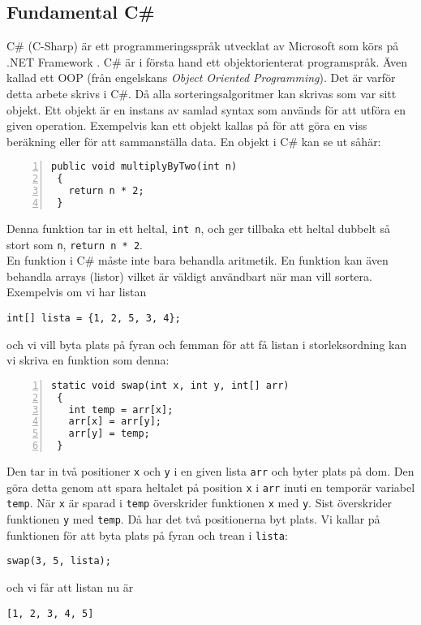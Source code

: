 \documentclass[a4, oneside]{report}
\begin{document}
\subsection{Fundamental C\#}
C\# (C-Sharp) är ett programmeringsspråk utvecklat av Microsoft som körs på .NET Framework \cite{7}. C\# är i första hand ett objektorienterat programspråk. Även kallad ett OOP (från engelskans \textit{Object Oriented Programming}). Det är varför detta arbete skrivs i C\#. Då alla sorteringsalgoritmer kan skrivas som var sitt objekt. Ett objekt är en instans av samlad syntax som används för att utföra en given operation. Exempelvis kan ett objekt kallas på för att göra en viss beräkning eller för att sammanställa data. En objekt i C\# kan se ut såhär:
\begin{lstlisting}[style=mystyle, numbers=left]
 public void multiplyByTwo(int n)
 {
   return n * 2;
 }
\end{lstlisting}
Denna funktion tar in ett heltal, \lstinline{int n}, och ger tillbaka ett heltal dubbelt så stort som \lstinline{n}, \lstinline{return n * 2}.\\
En funktion i C\# måste inte bara behandla aritmetik. En funktion kan även behandla arrays (listor) vilket är väldigt användbart när man vill sortera. Exempelvis om vi har listan
\begin{lstlisting}[style=mystyle, numbers=none]
 int[] lista = {1, 2, 5, 3, 4};
\end{lstlisting}
och vi vill byta plats på fyran och femman för att få listan i storleksordning kan vi skriva en funktion som denna:
\begin{lstlisting}[style=mystyle, numbers=left]
 static void swap(int x, int y, int[] arr)
 {
   int temp = arr[x];
   arr[x] = arr[y];
   arr[y] = temp;
 }
\end{lstlisting}
Den tar in två positioner \lstinline{x} och \lstinline{y} i en given lista \lstinline{arr} och byter plats på dom. Den göra detta genom att spara heltalet på position \lstinline{x} i \lstinline{arr} inuti en temporär variabel \lstinline{temp}. När \lstinline{x} är sparad i \lstinline{temp} överskrider funktionen \lstinline{x} med \lstinline{y}. Sist överskrider funktionen \lstinline{y} med \lstinline{temp}. Då har det två positionerna byt plats. Vi kallar på funktionen för att byta plats på fyran och trean i \lstinline{lista}:
\begin{lstlisting}[style=mystyle, numbers=none]
 swap(3, 5, lista);
\end{lstlisting}
och vi får att listan nu är 
\begin{lstlisting}[style=mystyle, numbers=none]
 [1, 2, 3, 4, 5]
\end{lstlisting}
\end{document}
